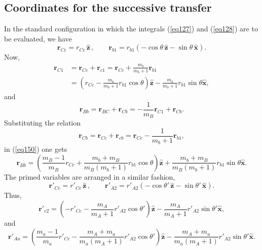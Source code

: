 \subsection{Coordinates for the successive transfer}
In the standard configuration in which the integrals (\ref{eq127}) and (\ref{eq128}) are to be evaluated, we have
\begin{equation}\label{eq148}
\mathbf{r}_{Cc}=r_{Cc}\, \hat {\mathbf{z}} \,, \qquad \mathbf{r}_{b1}=r_{b1}(-\cos\theta \, \hat {\mathbf{z}}-\sin\theta \, \hat {\mathbf{x}}).
\end{equation}
Now,
\begin{equation}\label{eq149}
\begin{split}
\mathbf{r}_{C1}&=\mathbf{r}_{Cc}+\mathbf{r}_{c1}=\mathbf{r}_{Cc}+\frac{m_b}{m_b+1}\mathbf{r}_{b1}\\
&=\left(r_{Cc}-\frac{m_b}{m_b+1}r_{b1}\cos\theta \right)\hat {\mathbf{z}}-\frac{m_b}{m_b+1}r_{b1}\sin\theta \hat {\mathbf{x}},
\end{split}
\end{equation}
and
\begin{equation}\label{eq150}
\mathbf{r}_{Bb}=\mathbf{r}_{BC}+\mathbf{r}_{Cb}=-\frac{1}{m_B}\mathbf{r}_{C1}+\mathbf{r}_{Cb}.
\end{equation}
Substituting the relation
\begin{equation}\label{eq151}
\mathbf{r}_{Cb}=\mathbf{r}_{Cc}+\mathbf{r}_{cb}=\mathbf{r}_{Cc}-\frac{1}{m_b+1}\mathbf{r}_{b1},
\end{equation}
in (\ref{eq150}) one gets
\begin{equation}\label{eq152}
\mathbf{r}_{Bb}=\left(\frac{m_B-1}{m_B}r_{Cc}+\frac{m_b+m_B}{m_B(m_b+1)}r_{b1}\cos\theta\right)\hat {\mathbf{z}}+\frac{m_b+m_B}{m_B(m_b+1)}r_{b1}\sin\theta\hat {\mathbf{x}}.
\end{equation}
The primed variables are arranged in a similar fashion,
\begin{equation}\label{eq153}
\mathbf{r}'_{Cc}=r'_{Cc}\, \hat {\mathbf{z}} \,, \qquad \mathbf{r}'_{A2}=r'_{A2}(-\cos\theta' \, \hat {\mathbf{z}}-\sin\theta' \, \hat {\mathbf{x}}).
\end{equation}
Thus,
\begin{equation}\label{eq154}
\mathbf{r}'_{c2}=\left(-r'_{Cc}-\frac{m_A}{m_A+1}r'_{A2}\cos\theta' \right)\hat {\mathbf{z}}-\frac{m_A}{m_A+1}r'_{A2}\sin\theta' \hat {\mathbf{x}},
\end{equation}
and
\begin{equation}\label{eq7_2_144}
\mathbf{r}'_{Aa}=\left(\frac{m_a-1}{m_a}r'_{Cc}-\frac{m_A+m_a}{m_a(m_A+1)}r'_{A2}\cos\theta'\right)\hat {\mathbf{z}}-\frac{m_A+m_a}{m_a(m_A+1)}r'_{A2}\sin\theta'\hat {\mathbf{x}}.
\end{equation}

